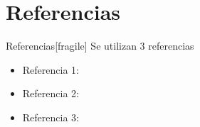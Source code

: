 \documentclass[11pt]{beamer}
\begin{document}
\section{Referencias}
\begin{frame}{Referencias}[fragile]
	Se utilizan 3 referencias
    \begin{itemize}
        \item Referencia 1: \cite{guang12}
        \item Referencia 2: \cite{juan15}
        \item Referencia 3: \cite{ying11}
    \end{itemize}
\end{frame}
\begin{frame}[fragile]
    \begin{verbatim}
        
        
    \end{verbatim}
\end{frame}
\end{document}
